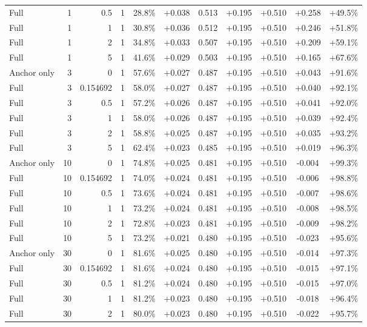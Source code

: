 \begin{table}[htbp]
\begin{tabular}{lrrrccccccc}
Full & 1 & 0.5 & 1 & 28.8\% & +0.038 & 0.513 & +0.195 & +0.510 & +0.258 & +49.5\% \\
Full & 1 & 1 & 1 & 30.8\% & +0.036 & 0.512 & +0.195 & +0.510 & +0.246 & +51.8\% \\
Full & 1 & 2 & 1 & 34.8\% & +0.033 & 0.507 & +0.195 & +0.510 & +0.209 & +59.1\% \\
Full & 1 & 5 & 1 & 41.6\% & +0.029 & 0.503 & +0.195 & +0.510 & +0.165 & +67.6\% \\
Anchor only & 3 & 0 & 1 & 57.6\% & +0.027 & 0.487 & +0.195 & +0.510 & +0.043 & +91.6\% \\
Full & 3 & 0.154692 & 1 & 58.0\% & +0.027 & 0.487 & +0.195 & +0.510 & +0.040 & +92.1\% \\
Full & 3 & 0.5 & 1 & 57.2\% & +0.026 & 0.487 & +0.195 & +0.510 & +0.041 & +92.0\% \\
Full & 3 & 1 & 1 & 58.0\% & +0.026 & 0.487 & +0.195 & +0.510 & +0.039 & +92.4\% \\
Full & 3 & 2 & 1 & 58.8\% & +0.025 & 0.487 & +0.195 & +0.510 & +0.035 & +93.2\% \\
Full & 3 & 5 & 1 & 62.4\% & +0.023 & 0.485 & +0.195 & +0.510 & +0.019 & +96.3\% \\
Anchor only & 10 & 0 & 1 & 74.8\% & +0.025 & 0.481 & +0.195 & +0.510 & -0.004 & +99.3\% \\
Full & 10 & 0.154692 & 1 & 74.0\% & +0.024 & 0.481 & +0.195 & +0.510 & -0.006 & +98.8\% \\
Full & 10 & 0.5 & 1 & 73.6\% & +0.024 & 0.481 & +0.195 & +0.510 & -0.007 & +98.6\% \\
Full & 10 & 1 & 1 & 73.2\% & +0.024 & 0.481 & +0.195 & +0.510 & -0.008 & +98.5\% \\
Full & 10 & 2 & 1 & 72.8\% & +0.023 & 0.481 & +0.195 & +0.510 & -0.009 & +98.2\% \\
Full & 10 & 5 & 1 & 73.2\% & +0.021 & 0.480 & +0.195 & +0.510 & -0.023 & +95.6\% \\
Anchor only & 30 & 0 & 1 & 81.6\% & +0.025 & 0.480 & +0.195 & +0.510 & -0.014 & +97.3\% \\
Full & 30 & 0.154692 & 1 & 81.6\% & +0.024 & 0.480 & +0.195 & +0.510 & -0.015 & +97.1\% \\
Full & 30 & 0.5 & 1 & 81.2\% & +0.024 & 0.480 & +0.195 & +0.510 & -0.015 & +97.0\% \\
Full & 30 & 1 & 1 & 81.2\% & +0.023 & 0.480 & +0.195 & +0.510 & -0.018 & +96.4\% \\
Full & 30 & 2 & 1 & 80.0\% & +0.023 & 0.480 & +0.195 & +0.510 & -0.022 & +95.7\% \\

\end{tabular}
\end{table}
